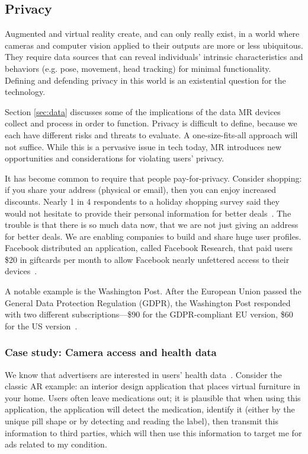 
\subsection{Privacy}
Augmented and virtual reality create, and can only really exist, in a world where cameras and computer vision applied to their outputs are more or less ubiquitous. They require data sources that can reveal individuals' intrinsic characteristics and behaviors (e.g. pose, movement, head tracking) for minimal functionality. Defining and defending privacy in this world is an existential question for the technology.

Section \ref{sec:data} discusses some of the implications of the data MR devices collect and process in order to function. Privacy is difficult to define, because we each have different risks and threats to evaluate. A one-size-fits-all approach will not suffice. While this is a pervasive issue in tech today, MR introduces new opportunities and considerations for violating users' privacy.

It has become common to require that people pay-for-privacy. Consider shopping: if you share your address (physical or email), then you can enjoy increased discounts. Nearly 1 in 4 respondents to a holiday shopping survey said they would not hesitate to provide their personal information for better deals~\cite{moses}. The trouble is that there is so much data now, that we are not just giving an address for better deals. We are enabling companies to build and share huge user profiles. Facebook distributed an application, called Facebook Research, that paid users \$20 in giftcards per month to allow Facebook nearly unfettered access to their devices~\cite{axon}.

A notable example is the Washington Post. After the European Union passed the General Data Protection Regulation (GDPR), the Washington Post responded with two different subscriptions---\$90 for the GDPR-compliant EU version, \$60 for the US version~\cite{karl}.

\subsubsection{Case study: Camera access and health data}\label{sec:data:world:camera}

We know that advertisers are interested in users' health data~\cite{jeong2019insurers}. Consider the classic AR example: an interior design application that places virtual furniture in your home. Users often leave medications out; it is plausible that when using this application, the application will detect the medication, identify it (either by the unique pill shape or by detecting and reading the label), then transmit this information to third parties, which will then use this information to target me for ads related to my condition.

